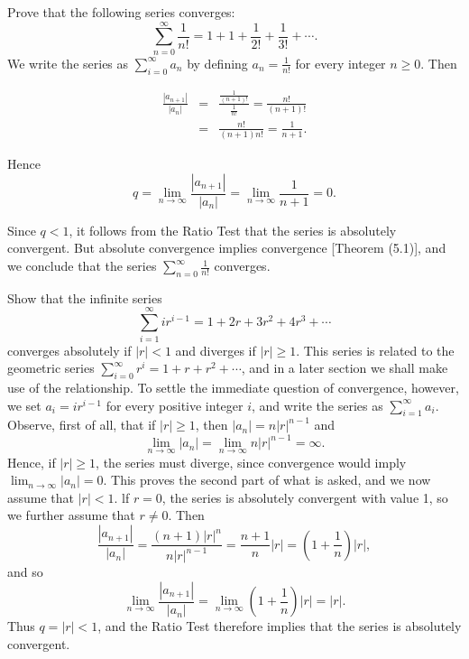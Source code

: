 \begin{example} 
Prove that the following series converges:
$$
\sum_{n=0}^\infty \frac{1}{n!} = 1 + 1 + \frac{1}{2!} + \frac{1}{3!} + \cdots .
$$
\noindent We write the series as $\sum_{i=0}^{\infty} a_n $ by defining $a_n = \frac{1}{n!}$ for every integer $n \geq 0$. Then 

\begin{eqnarray*}
\frac{|a_{n+1}|}{|a_n|} 
&=& \frac{\frac{1}{(n+1)!} }{\frac{1}{n!}} = \frac{n!}{(n+1)!}\\
&=&\frac{n!}{(n+1)n!} = \frac{1}{n+1} .
\end{eqnarray*}

\noindent Hence
$$
q = \lim_{n \rightarrow \infty} \frac{|a_{n+1}|}{|a_n|}  = \lim_{n \rightarrow \infty} \frac{1}{n + 1} = 0.
$$

\noindent Since $q < 1$, it follows from the Ratio Test that the series is absolutely convergent. But absolute convergence implies convergence [Theorem (5.1)], and we conclude that the series $\sum_{n=0}^{\infty} \frac{1}{n!}$ converges.
\end{example}

\begin{example} Show that the infinite series 
$$
\sum_{i=1}^{\infty} ir^{i-1}  = 1 + 2r + 3r^2 + 4r^3 + \cdots
$$
\noindent  converges absolutely if $|r| < 1$ and diverges if $|r| \geq 1$. This series is related to the geometric series $\sum_{i=0}^{\infty} r^i = 1 + r + r^2 + \cdots $, and in a later section we shall make use of the relationship. To settle the immediate question of convergence, however, we set $a_i = ir^{i-1}$ for every positive integer $i$, and write the series as $\sum_{i=1}^{\infty} a_i$. Observe, first of all, that if $|r| \geq 1$, then $|a_n| = n|r|^{n-1}$ and
$$
\lim_{n \rightarrow \infty} |a_n| = \lim_{n \rightarrow \infty} n|r|^{n-1} = \infty .
$$
\noindent Hence, if $|r| \geq 1$, the series must diverge, since convergence would imply $\lim_{n \rightarrow \infty} |a_n| = 0$. This proves the second part of what is asked, and we now assume that $|r| < 1$. lf $r = 0$, the series is absolutely convergent with value 1, so we further assume that $r \neq 0$. Then
$$
\frac{|a_{n+1}|}{|a_n|} = \frac{(n+1) |r|^n}{n |r|^{n-1}} = \frac{n+1}{n} |r| = (1 + \frac{1}{n}) |r|,
$$
\noindent and so 
$$
\lim_{n \rightarrow \infty} \frac{|a_{n+1}|}{|a_n|} = \lim_{n \rightarrow \infty}  (1 + \frac{1}{n}) |r| = |r|.
$$
\noindent Thus $q = |r| < 1$, and the Ratio Test therefore implies that the series is absolutely convergent.
\end{example}

